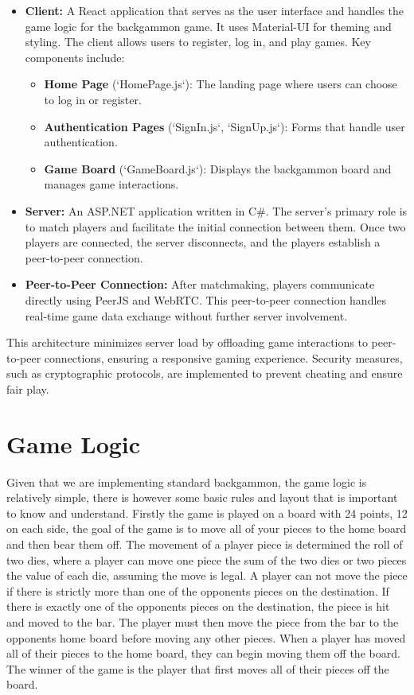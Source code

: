 \documentclass[ twoside,openright,titlepage,numbers=noenddot,headinclude,%
                footinclude=true,cleardoublepage=empty,abstractoff, %
                BCOR=5mm,paper=a4,fontsize=11pt,%
                ngerman,american,%
                ]{scrreprt}
\begin{document}
\begin{itemize}
  \item \textbf{Client:} A React application that serves as the user interface and handles the game logic for the backgammon game. It uses Material-UI for theming and styling. The client allows users to register, log in, and play games. Key components include:

  \begin{itemize}
    \item \textbf{Home Page} (`HomePage.js`): The landing page where users can choose to log in or register.
    \item \textbf{Authentication Pages} (`SignIn.js`, `SignUp.js`): Forms that handle user authentication.
    \item \textbf{Game Board} (`GameBoard.js`): Displays the backgammon board and manages game interactions.
  \end{itemize}
  
  \item \textbf{Server:} An ASP.NET application written in C\#. The server's primary role is to match players and facilitate the initial connection between them. Once two players are connected, the server disconnects, and the players establish a peer-to-peer connection.
  
  \item \textbf{Peer-to-Peer Connection:} After matchmaking, players communicate directly using PeerJS and WebRTC. This peer-to-peer connection handles real-time game data exchange without further server involvement.

\end{itemize}

This architecture minimizes server load by offloading game interactions to peer-to-peer connections, ensuring a responsive gaming experience. Security measures, such as cryptographic protocols, are implemented to prevent cheating and ensure fair play.



\section{Game Logic}
Given that we are implementing standard backgammon, the game logic is relatively simple, there is however some basic rules and layout that is important to know and understand. Firstly the game is played on a board with 24 points, 12 on each side, the goal of the game is to move all of your pieces to the home board and then bear them off. The movement of a player piece is determined the roll of two dies, where a player can move one piece the sum of the two dies or two pieces the value of each die, assuming the move is legal. A player can not move the piece if there is strictly more than one of the opponents pieces on the destination. If there is exactly one of the opponents pieces on the destination, the piece is hit and moved to the bar. The player must then move the piece from the bar to the opponents home board before moving any other pieces. When a player has moved all of their pieces to the home board, they can begin moving them off the board. The winner of the game is the player that first moves all of their pieces off the board.
\end{document}
